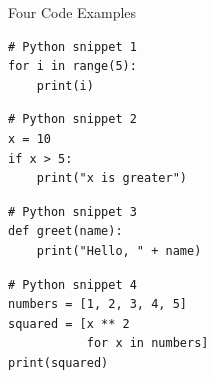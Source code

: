 \documentclass[
	11pt, 
]{beamer}
\begin{document}
\begin{frame}[fragile]{Four Code Examples}
    \small %
    \begin{minipage}[t]{0.45\textwidth}
        \begin{verbatim}
# Python snippet 1
for i in range(5):
    print(i)
        \end{verbatim}
    \end{minipage}
    \hfill
    \begin{minipage}[t]{0.45\textwidth}
        \begin{verbatim}
# Python snippet 2
x = 10
if x > 5:
    print("x is greater")
        \end{verbatim}
    \end{minipage}

    \vspace{1em} %

    \begin{minipage}[t]{0.45\textwidth}
        \begin{verbatim}
# Python snippet 3
def greet(name):
    print("Hello, " + name)
        \end{verbatim}
    \end{minipage}
    
    \vspace{1em}
    
    \begin{minipage}[t]{0.45\textwidth}
        \begin{verbatim}
# Python snippet 4
numbers = [1, 2, 3, 4, 5]
squared = [x ** 2 
           for x in numbers]
print(squared)
        \end{verbatim}
    \end{minipage}
\end{frame}

\end{document}
